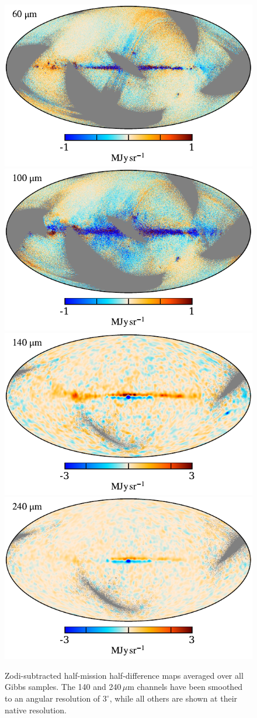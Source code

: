 \documentclass{aa}
\begin{document}
\begin{figure}
       	\includegraphics[width=0.35\linewidth]{figs/hmhd_07.pdf}
       	\includegraphics[width=0.35\linewidth]{figs/hmhd_08.pdf}\\       
       	\includegraphics[width=0.35\linewidth]{figs/hmhd_09.pdf}
       	\includegraphics[width=0.35\linewidth]{figs/hmhd_10.pdf}       
       	\caption{Zodi-subtracted half-mission half-difference maps averaged over all Gibbs samples. The 140 and 240\,$\mu$m channels have been smoothed to an angular resolution of $3^{\circ}$, while all others are shown at their native resolution. }
       	\label{fig:hmhd}
       \end{figure}
       
\end{document}
